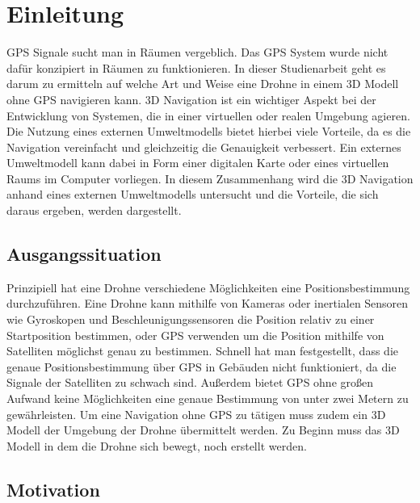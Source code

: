 \chapter{Einleitung}

GPS Signale sucht man in Räumen vergeblich. Das GPS System wurde nicht dafür konzipiert in Räumen zu funktionieren.
In dieser Studienarbeit geht es darum zu ermitteln auf welche Art und Weise eine Drohne in einem 3D Modell ohne GPS navigieren kann.
3D Navigation ist ein wichtiger Aspekt bei der Entwicklung von Systemen, die in einer virtuellen oder realen Umgebung agieren. Die Nutzung eines externen Umweltmodells bietet hierbei viele Vorteile, da es die Navigation vereinfacht und gleichzeitig die Genauigkeit verbessert. Ein externes Umweltmodell kann dabei in Form einer digitalen Karte oder eines virtuellen Raums im Computer vorliegen. In diesem Zusammenhang wird die 3D Navigation anhand eines externen Umweltmodells untersucht und die Vorteile, die sich daraus ergeben, werden dargestellt.



\section{Ausgangssituation}

Prinzipiell hat eine Drohne verschiedene Möglichkeiten eine Positionsbestimmung durchzuführen.
Eine Drohne kann mithilfe von Kameras oder inertialen Sensoren wie Gyroskopen und Beschleunigungssensoren die Position relativ zu einer Startposition bestimmen, oder \ac{GPS} verwenden um die Position mithilfe von Satelliten möglichst genau zu bestimmen.
Schnell hat man festgestellt, dass die genaue Positionsbestimmung über GPS in Gebäuden nicht funktioniert, da die Signale der Satelliten zu schwach sind. Außerdem bietet \ac{GPS} ohne großen Aufwand keine Möglichkeiten eine genaue Bestimmung von unter zwei Metern zu gewährleisten.
Um eine Navigation ohne GPS zu tätigen muss zudem ein 3D Modell der Umgebung der Drohne übermittelt werden.
Zu Beginn muss das 3D Modell in dem die Drohne sich bewegt, noch erstellt werden.


\section{Motivation}


